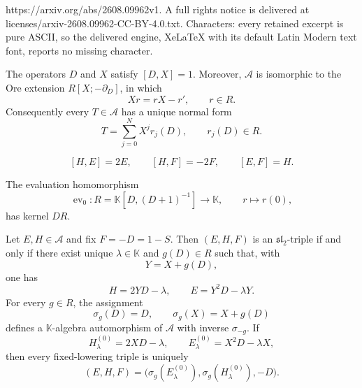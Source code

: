 \documentclass[10pt,a4paper]{amsart}
\newcommand{\K}{\mathbb K}
\newcommand{\algA}{\mathcal A}
\newcommand{\ev}{\operatorname{ev}}
\begin{document}
https://arxiv.org/abs/2608.09962v1. A full rights notice is delivered at licenses/arxiv-2608.09962-CC-BY-4.0.txt. Characters: every retained excerpt is pure ASCII, so the delivered engine, XeLaTeX with its default Latin Modern text font, reports no missing character.
\begin{proposition}\label{prop:ore}
The operators $D$ and $X$ satisfy $[D,X]=1$.  Moreover, $\algA$ is isomorphic to the Ore extension $R[X;-\partial_D]$, in which
\[
 Xr=rX-r',\qquad r\in R.
\]
Consequently every $T\in\algA$ has a unique normal form
\[
 T=\sum_{j=0}^{N}X^j r_j(D),
 \qquad
 r_j(D)\in R.
\]
\end{proposition}

\begin{equation}\label{eq:sl2-relations}
 [H,E]=2E,
 \qquad
 [H,F]=-2F,
 \qquad
 [E,F]=H.
\end{equation}

\begin{lemma}\label{lem:evaluation}
The evaluation homomorphism
\[
 \ev_0:R=\K[D,(D+1)^{-1}]\longrightarrow\K,
 \qquad
 r\longmapsto r(0),
\]
has kernel $DR$.
\end{lemma}

\begin{theorem}\label{thm:classification}
Let $E,H\in\algA$ and fix $F=-D=1-S$.  Then $(E,H,F)$ is an $\mathfrak{sl}_2$-triple if and only if there exist unique $\lambda\in\K$ and $g(D)\in R$ such that, with
\[
 Y=X+g(D),
\]
one has
\begin{equation}\label{eq:normal-form}
 H=2YD-\lambda,
 \qquad
 E=Y^2D-\lambda Y.
\end{equation}
For every $g\in R$, the assignment
\begin{equation}\label{eq:shear-automorphism}
 \sigma_g(D)=D,
 \qquad
 \sigma_g(X)=X+g(D)
\end{equation}
defines a $\K$-algebra automorphism of $\algA$ with inverse $\sigma_{-g}$.  If
\[
 H^{(0)}_\lambda=2XD-\lambda,
 \qquad
 E^{(0)}_\lambda=X^2D-\lambda X,
\]
then every fixed-lowering triple is uniquely
\[
 (E,H,F)=\bigl(\sigma_g(E^{(0)}_\lambda),
 \sigma_g(H^{(0)}_\lambda),-D\bigr).
\]
\end{theorem}
\end{document}
